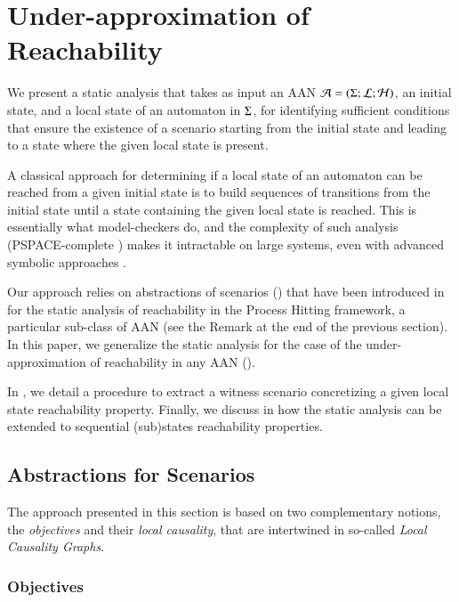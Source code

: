 \section{Under-approximation of Reachability}\label{sec:sa}

We present a static analysis that takes as input an AAN
$\mathcal{A} = (\Sigma; \mathcal{L}; \mathcal{H})$,
an initial state, and a local state of an automaton in $\Sigma$, for identifying sufficient conditions
that ensure the existence of a scenario starting from the initial state and leading to a state
where the given local state is present.

A classical approach for determining if a local state of an automaton can be
reached from a given initial state is to build sequences of transitions from the initial state until a state
containing the given local state is reached.
This is essentially what model-checkers do, and the complexity of such analysis (PSPACE-complete
\cite{Harel02}) makes it intractable on large systems, even with advanced symbolic approaches
\cite{PMR12-MSCS}.

Our approach relies on abstractions of scenarios () that have been introduced in
\cite{PMR12-MSCS} for the static analysis of reachability in the Process Hitting framework,
a particular sub-class of AAN (see the Remark at the end of the previous section).
In this paper, we generalize the static analysis for the case of the under-approximation of
reachability in any AAN ().

In , we detail a procedure to extract a witness scenario
concretizing a given local state reachability property.
Finally, we discuss in  how the static analysis can be
extended to sequential (sub)states reachability properties.


\subsection{Abstractions for Scenarios}
\label{ssec:abstr-sce}

The approach presented in this section is based on two complementary notions,
the \emph{objectives} and their \emph{local causality},
that are intertwined in so-called \emph{Local Causality Graphs}.

\subsubsection{Objectives}

